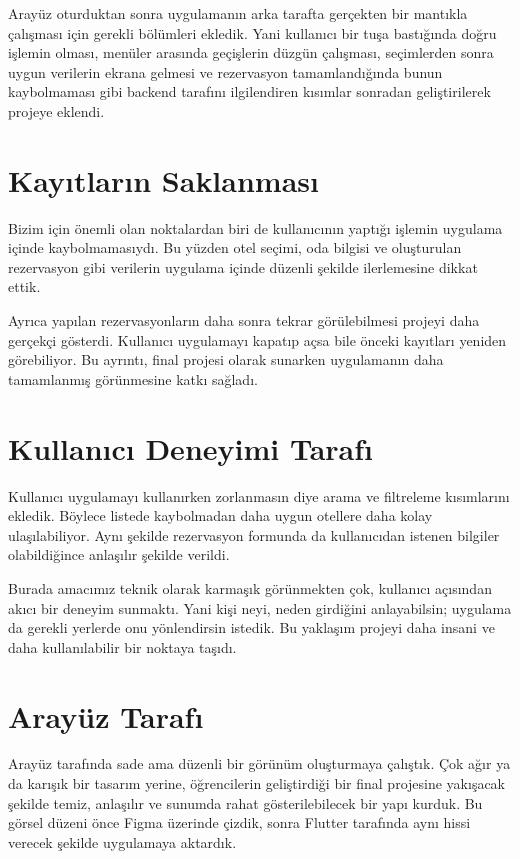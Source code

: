 \documentclass[11pt,a4paper]{article}
\begin{document}
Arayüz oturduktan sonra uygulamanın arka tarafta gerçekten bir mantıkla çalışması için gerekli bölümleri ekledik. Yani kullanıcı bir tuşa bastığında doğru işlemin olması, menüler arasında geçişlerin düzgün çalışması, seçimlerden sonra uygun verilerin ekrana gelmesi ve rezervasyon tamamlandığında bunun kaybolmaması gibi backend tarafını ilgilendiren kısımlar sonradan geliştirilerek projeye eklendi.

\section{Kayıtların Saklanması}
Bizim için önemli olan noktalardan biri de kullanıcının yaptığı işlemin uygulama içinde kaybolmamasıydı. Bu yüzden otel seçimi, oda bilgisi ve oluşturulan rezervasyon gibi verilerin uygulama içinde düzenli şekilde ilerlemesine dikkat ettik.

Ayrıca yapılan rezervasyonların daha sonra tekrar görülebilmesi projeyi daha gerçekçi gösterdi. Kullanıcı uygulamayı kapatıp açsa bile önceki kayıtları yeniden görebiliyor. Bu ayrıntı, final projesi olarak sunarken uygulamanın daha tamamlanmış görünmesine katkı sağladı.

\section{Kullanıcı Deneyimi Tarafı}
Kullanıcı uygulamayı kullanırken zorlanmasın diye arama ve filtreleme kısımlarını ekledik. Böylece listede kaybolmadan daha uygun otellere daha kolay ulaşılabiliyor. Aynı şekilde rezervasyon formunda da kullanıcıdan istenen bilgiler olabildiğince anlaşılır şekilde verildi.

Burada amacımız teknik olarak karmaşık görünmekten çok, kullanıcı açısından akıcı bir deneyim sunmaktı. Yani kişi neyi, neden girdiğini anlayabilsin; uygulama da gerekli yerlerde onu yönlendirsin istedik. Bu yaklaşım projeyi daha insani ve daha kullanılabilir bir noktaya taşıdı.

\section{Arayüz Tarafı}
Arayüz tarafında sade ama düzenli bir görünüm oluşturmaya çalıştık. Çok ağır ya da karışık bir tasarım yerine, öğrencilerin geliştirdiği bir final projesine yakışacak şekilde temiz, anlaşılır ve sunumda rahat gösterilebilecek bir yapı kurduk. Bu görsel düzeni önce Figma üzerinde çizdik, sonra Flutter tarafında aynı hissi verecek şekilde uygulamaya aktardık.
\end{document}
